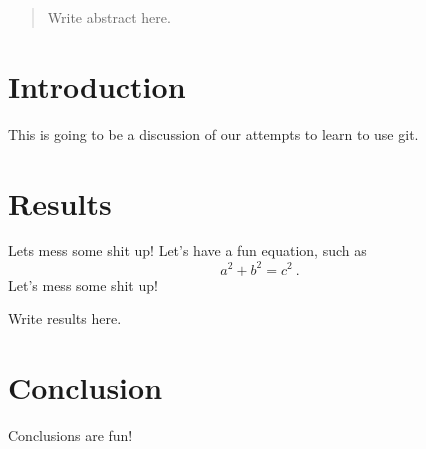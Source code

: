 \documentclass{article}
\begin{document}
\begin{abstract}
Write abstract here.
\end{abstract}

\section{Introduction}

This is going to be a discussion of our attempts to learn to use git.

\section{Results}

Lets mess some shit up!
Let's have a fun equation, such as
\begin{equation}
a^2 + b^2 = c^2~.
\end{equation}
Let's mess some shit up!

Write results here.

\section{Conclusion}

Conclusions are fun!
\end{document}
